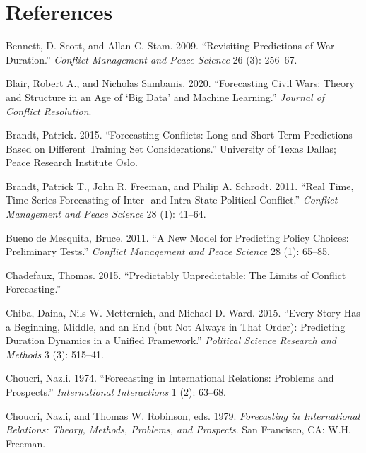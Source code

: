 \documentclass[]{article}
\begin{document}
\hypertarget{references}{%
\section*{References}\label{references}}

\hypertarget{refs}{}
\leavevmode\hypertarget{ref-bennett:stam:2009}{}%
Bennett, D. Scott, and Allan C. Stam. 2009. ``Revisiting Predictions of
War Duration.'' \emph{Conflict Management and Peace Science} 26 (3):
256--67.

\leavevmode\hypertarget{ref-blair2020forecasting}{}%
Blair, Robert A., and Nicholas Sambanis. 2020. ``Forecasting Civil Wars:
Theory and Structure in an Age of `Big Data' and Machine Learning.''
\emph{Journal of Conflict Resolution}.

\leavevmode\hypertarget{ref-brandt:2015}{}%
Brandt, Patrick. 2015. ``Forecasting Conflicts: Long and Short Term
Predictions Based on Different Training Set Considerations.'' University
of Texas Dallas; Peace Research Institute Oslo.

\leavevmode\hypertarget{ref-Brandt_etal_2011}{}%
Brandt, Patrick T., John R. Freeman, and Philip A. Schrodt. 2011. ``Real
Time, Time Series Forecasting of Inter- and Intra-State Political
Conflict.'' \emph{Conflict Management and Peace Science} 28 (1): 41--64.

\leavevmode\hypertarget{ref-bdm:2011}{}%
Bueno de Mesquita, Bruce. 2011. ``A New Model for Predicting Policy
Choices: Preliminary Tests.'' \emph{Conflict Management and Peace
Science} 28 (1): 65--85.

\leavevmode\hypertarget{ref-chadefaux:2015}{}%
Chadefaux, Thomas. 2015. ``Predictably Unpredictable: The Limits of
Conflict Forecasting.''

\leavevmode\hypertarget{ref-chiba:etal:2015}{}%
Chiba, Daina, Nils W. Metternich, and Michael D. Ward. 2015. ``Every
Story Has a Beginning, Middle, and an End (but Not Always in That
Order): Predicting Duration Dynamics in a Unified Framework.''
\emph{Political Science Research and Methods} 3 (3): 515--41.

\leavevmode\hypertarget{ref-choucri:1974}{}%
Choucri, Nazli. 1974. ``Forecasting in International Relations: Problems
and Prospects.'' \emph{International Interactions} 1 (2): 63--68.

\leavevmode\hypertarget{ref-choucri:robinson:1979}{}%
Choucri, Nazli, and Thomas W. Robinson, eds. 1979. \emph{Forecasting in
International Relations: Theory, Methods, Problems, and Prospects}. San
Francisco, CA: W.H. Freeman.
\end{document}
